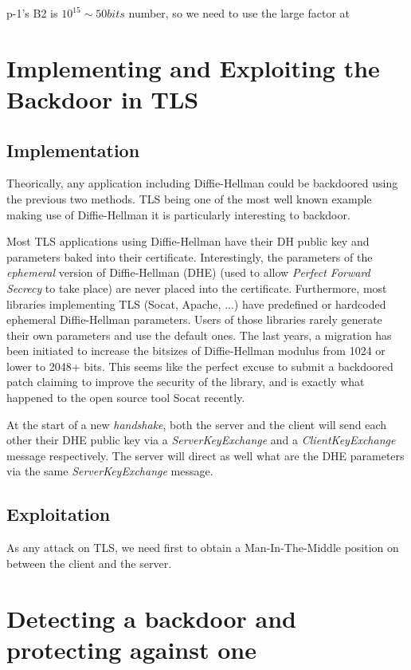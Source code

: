 \documentclass[a4paper,11pt,twocolumn]{article}
\begin{document}
p-1's B2 is $10^{15} \sim 50bits$ number, so we need to use the large factor at

\section{Implementing and Exploiting the Backdoor in TLS}

\subsection{Implementation}

Theorically, any application including Diffie-Hellman could be backdoored using the previous two methods. TLS being one of the most well known example making use of Diffie-Hellman it is particularly interesting to backdoor.

Most TLS applications using Diffie-Hellman have their DH public key and parameters baked into their certificate. Interestingly, the parameters of the \emph{ephemeral} version of Diffie-Hellman (DHE) (used to allow \emph{Perfect Forward Secrecy} to take place) are never placed into the certificate. Furthermore, most libraries implementing TLS (Socat, Apache, ...) have predefined or hardcoded ephemeral Diffie-Hellman parameters. Users of those libraries rarely generate their own parameters and use the default ones. The last years, a migration has been initiated to increase the bitsizes of Diffie-Hellman modulus from 1024 or lower to 2048+ bits. This seems like the perfect excuse to submit a backdoored patch claiming to improve the security of the library, and is exactly what happened to the open source tool Socat recently.

At the start of a new \emph{handshake}, both the server and the client will send each other their DHE public key via a \emph{ServerKeyExchange} and a \emph{ClientKeyExchange} message respectively. The server will direct as well what are the DHE parameters via the same \emph{ServerKeyExchange} message.

\subsection{Exploitation}

As any attack on TLS, we need first to obtain a Man-In-The-Middle position on between the client and the server.


\section{Detecting a backdoor and protecting against one}
\end{document}
